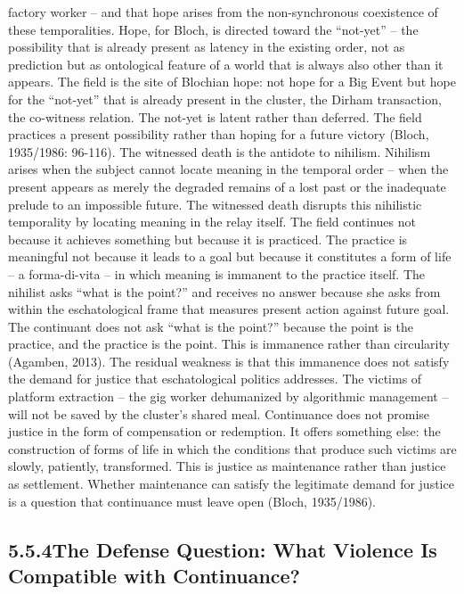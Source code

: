 factory worker – and that hope arises from the non-synchronous coexistence of these temporalities. Hope, for Bloch, is directed toward the “not-yet” – the possibility that is already present as latency in the existing order, not as prediction but as ontological feature of a world that is always also other than it appears. The field is the site of Blochian hope: not hope for a Big Event but hope for the “not-yet” that is already present in the cluster, the Dirham transaction, the co-witness relation. The not-yet is latent rather than deferred. The field practices a present possibility rather than hoping for a future victory (Bloch, 1935/1986: 96-116). The witnessed death is the antidote to nihilism. Nihilism arises when the subject cannot locate meaning in the temporal order – when the present appears as merely the degraded remains of a lost past or the inadequate prelude to an impossible future. The witnessed death disrupts this nihilistic temporality by locating meaning in the relay itself. The field continues not because it achieves something but because it is practiced. The practice is meaningful not because it leads to a goal but because it constitutes a form of life – a forma-di-vita – in which meaning is immanent to the practice itself. The nihilist asks “what is the point?” and receives no answer because she asks from within the eschatological frame that measures present action against future goal. The continuant does not ask “what is the point?” because the point is the practice, and the practice is the point. This is immanence rather than circularity (Agamben, 2013). The residual weakness is that this immanence does not satisfy the demand for justice that eschatological politics addresses. The victims of platform extraction – the gig worker dehumanized by algorithmic management – will not be saved by the cluster’s shared meal. Continuance does not promise justice in the form of compensation or redemption. It offers something else: the construction of forms of life in which the conditions that produce such victims are slowly, patiently, transformed. This is justice as maintenance rather than justice as settlement. Whether maintenance can satisfy the legitimate demand for justice is a question that continuance must leave open (Bloch, 1935/1986).

\subsection{5.5.4\quad The Defense Question: What Violence Is Compatible with Continuance?}

